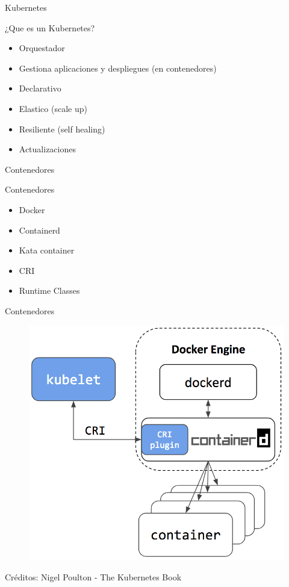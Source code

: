 \documentclass[aspectratio=169]{beamer}
\begin{document}
\begin{frame}{Kubernetes}

    \begin{alertblock}{¿Que es un Kubernetes?}
        \begin{itemize}
            \item Orquestador
            \item Gestiona aplicaciones y despliegues (en contenedores)
            \item Declarativo
            \item Elastico (scale up)
            \item Resiliente (self healing)
            \item Actualizaciones
        \end{itemize}
    \end{alertblock}

\end{frame}

\begin{frame}{Contenedores}

    \begin{exampleblock}{Contenedores}
        \begin{itemize}
            \item Docker
            \item Containerd
            \item Kata container
            \item CRI
            \item Runtime Classes
        \end{itemize}
    \end{exampleblock}

\end{frame}




\begin{frame}{Contenedores}
    \begin{figure}
        \centering
        \includegraphics[width=0.4\linewidth]{Images/dockercontainerd.png}
    \end{figure}
Créditos: Nigel Poulton - The Kubernetes Book
\end{frame}
\end{document}
